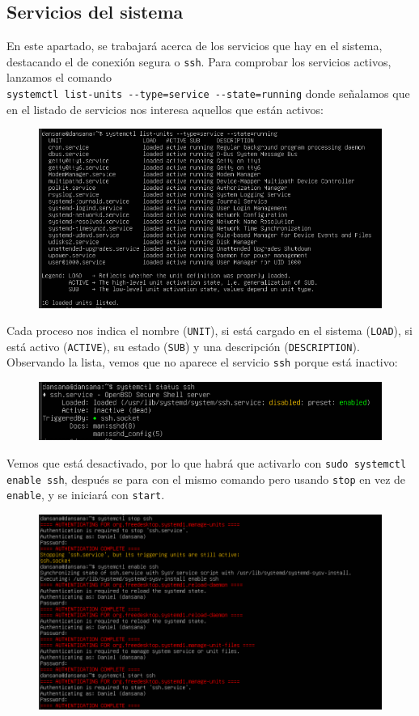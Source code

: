 \documentclass[10pt]{article}
\begin{document}
	\subsection{Servicios del sistema}
	En este apartado, se trabajará acerca de los servicios que hay en el sistema, destacando el de conexión segura o \verb|ssh|. Para comprobar los servicios activos, lanzamos el comando \\ \verb|systemctl list-units --type=service --state=running| donde señalamos que en el listado de servicios nos interesa aquellos que están activos:
	\begin{figure}[H]
		\setlength{\abovecaptionskip}{0cm}
		\setlength{\belowcaptionskip}{0cm}
		\centering
		\includegraphics[width=0.7\linewidth]{Recursos/activeProcess.png}
	\end{figure}
	Cada proceso nos indica el nombre (\verb|UNIT|), si está cargado en el sistema (\verb|LOAD|), si está activo (\verb|ACTIVE|), su estado (\verb|SUB|) y una descripción (\verb|DESCRIPTION|). Observando la lista, vemos que no aparece el servicio \verb|ssh| porque está inactivo:
	\begin{figure}[H]
		\setlength{\abovecaptionskip}{0cm}
		\setlength{\belowcaptionskip}{0cm}
		\centering
		\includegraphics[width=0.8\linewidth]{Recursos/statusSSH.png}
	\end{figure}
	Vemos que está desactivado, por lo que habrá que activarlo con \verb|sudo systemctl enable ssh|, después se para con el mismo comando pero usando \verb|stop| en vez de \verb|enable|, y se iniciará con \verb|start|.
	\begin{figure}[H]
		\setlength{\abovecaptionskip}{0cm}
		\setlength{\belowcaptionskip}{0cm}
		\centering
		\includegraphics[width=0.7\linewidth]{Recursos/sshService.png}
	\end{figure}
\end{document}
